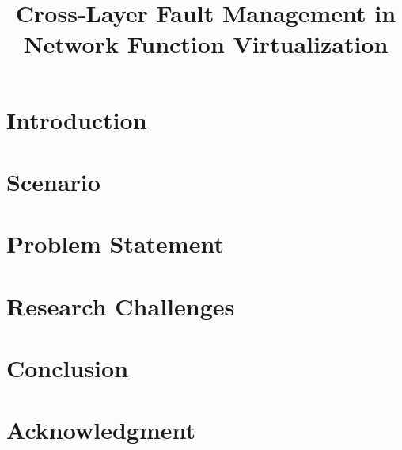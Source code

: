 \documentclass[a4paper,twocolumn,conference]{IEEEtran}
\begin{document}

\title{Cross-Layer Fault Management in Network Function Virtualization}

\author{
}

\maketitle

\begin{abstract}
	
\end{abstract}

\IEEEpeerreviewmaketitle

\section{Introduction}
	

\section{Scenario}
	
%
\section{Problem Statement}
	

\section{Research Challenges}
	

\section{Conclusion}
	

\section*{Acknowledgment}



\end{document}

